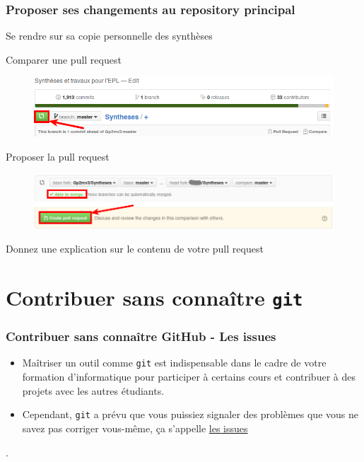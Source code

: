 \documentclass{beamer}
\newenvironment{wideitemize}{\itemize\addtolength{\itemsep}{10pt}}{\enditemize}
\begin{document}
\begin{frame}
    \frametitle{Proposer ses changements au repository principal}
    \begin{wideitemize}
        \item Se rendre sur sa copie personnelle des synthèses
        \pause
        \item Comparer une pull request
            \begin{figure}[H]
                \centering
                \includegraphics[width=\linewidth]{pull_request.png}
            \end{figure}
         \pause
         \item Proposer la pull request
            \begin{figure}[H]
                \centering
                \includegraphics[width=\linewidth]{create_pull_request.png}
            \end{figure}
         \pause
         \item Donnez une explication sur le contenu de votre pull request
     \end{wideitemize}
\end{frame}

\section{Contribuer sans connaître \texttt{git}}

\begin{frame}
    \frametitle{Contribuer sans connaître GitHub - Les issues}
    \begin{itemize}
        \item Ma\^itriser un outil comme \lstinline|git| est indispensable dans le
            cadre de votre formation d'informatique pour participer à
            certains cours et contribuer à des projets avec les autres
            étudiants.
        \item Cependant, \lstinline|git| a prévu que vous puissiez signaler des
            problèmes que vous ne savez pas corriger vous-même, ça
            s'appelle \href{https://github.com/Gp2mv3/Syntheses/issues}{les issues}
    \end{itemize}
\end{frame}.
\end{document}
